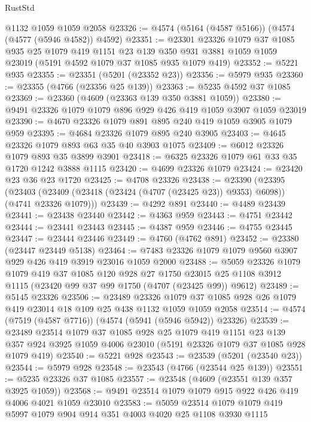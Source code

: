 \begin{lexlean}{RustStd}
\begin{coremodule}
    @1132
    @1059
    @1059
    @2058
@23326 := @4574 (@5164 (@4587 @5166)) (@4574 (@4577 (@5946 @4582)) @4592)
@23351 := @23301
    @23326
    @1079
    @37
    @1085
    @935
    @25
    @1079
    @419
    @1151
    @23
    @139
    @350
    @931
    @3881
    @1059
    @1059
    @23019
    (@5191 @4592 @1079 @37 @1085 @935 @1079 @419)
@23352 := @5221 @935
@23355 := @23351 (@5201 (@23352 @23))
@23356 := @5979 @935
@23360 := @23355 (@4766 (@23356 @25 @139))
@23363 := @5235 @4592 @37 @1085
@23369 := @23360 (@4609 (@23363 @139 @350 @3881 @1059))
@23380 := @9491 @23326 @1079 @1079 @896 @929 @426 @419 @1059 @3907 @1059 @23019
@23390 := @4670 @23326 @1079 @891 @895 @240 @419 @1059 @3905 @1079 @959
@23395 := @4684 @23326 @1079 @895 @240 @3905
@23403 := @4645 @23326 @1079 @893 @63 @35 @40 @3903 @1075
@23409 := @6012 @23326 @1079 @893 @35 @3899 @3901
@23418 := @6325 @23326 @1079 @61 @33 @35 @1720 @1242 @3888 @1115
@23420 := @4699 @23326 @1079
@23424 := @23420 @23 @36 @23 @1720
@23425 := @4708 @23326
@23438 := @23390
    (@23395
      (@23403 (@23409 (@23418 (@23424 (@4707 (@23425 @23)) @9353) @6098)) (@4741 @23326 @1079)))
@23439 := @4292 @891
@23440 := @4489 @23439
@23441 := @23438 @23440
@23442 := @4363 @959
@23443 := @4751 @23442
@23444 := @23441 @23443
@23445 := @4387 @959
@23446 := @4755 @23445
@23447 := @23444 @23446
@23449 := @4760 (@4762 @891)
@23452 := @23380 (@23447 @23449 @5138)
@23464 := @7483 @23326 @1079 @1079 @9560 @3907 @929 @426 @419 @3919 @23016 @1059 @2000
@23488 := @5059
    @23326
    @1079
    @1079
    @419
    @37
    @1085
    @120
    @928
    @27
    @1750
    @23015
    @25
    @1108
    @3912
    @1115
    (@23420 @99 @37 @99 @1750 (@4707 (@23425 @99)) @9612)
@23489 := @5145 @23326
@23506 := @23489
    @23326
    @1079
    @37
    @1085
    @928
    @26
    @1079
    @419
    @23014
    @18
    @109
    @25
    @438
    @1132
    @1059
    @1059
    @2058
@23514 := @4574 (@7519 (@4587 @7716)) (@4574 (@5941 (@5946 @5942)) @23326)
@23539 := @23489
    @23514
    @1079
    @37
    @1085
    @928
    @25
    @1079
    @419
    @1151
    @23
    @139
    @357
    @924
    @3925
    @1059
    @4006
    @23010
    (@5191 @23326 @1079 @37 @1085 @928 @1079 @419)
@23540 := @5221 @928
@23543 := @23539 (@5201 (@23540 @23))
@23544 := @5979 @928
@23548 := @23543 (@4766 (@23544 @25 @139))
@23551 := @5235 @23326 @37 @1085
@23557 := @23548 (@4609 (@23551 @139 @357 @3925 @1059))
@23568 := @9491 @23514 @1079 @1079 @915 @922 @426 @419 @4006 @4021 @1059 @23010
@23583 := @5059 @23514 @1079 @1079 @419 @5997 @1079 @904 @914 @351 @4003 @4020 @25 @1108 @3930 @1115

\end{coremodule}
\end{lexlean}
